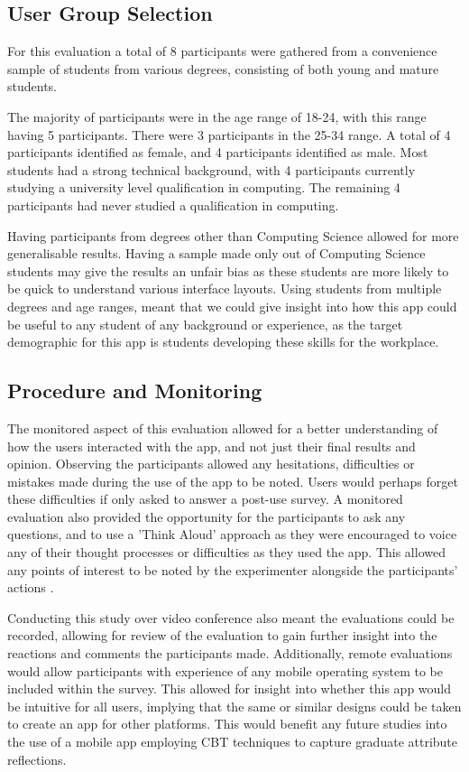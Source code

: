 \documentclass{l4proj}
\begin{document}
\subsection{User Group Selection}

For this evaluation a total of 8 participants were gathered from a convenience sample of students from various degrees, consisting of both young and mature students. 

The majority of participants were in the age range of 18-24, with this range having 5 participants. There were 3 participants in the 25-34 range. A total of 4 participants identified as female, and 4 participants identified as male. Most students had a strong technical background, with 4 participants currently studying a university level qualification in computing. The remaining 4 participants had never studied a qualification in computing.

Having participants from degrees other than Computing Science allowed for more generalisable results. Having a sample made only out of Computing Science students may give the results an unfair bias as these students are more likely to be quick to understand various interface layouts. Using students from multiple degrees and age ranges, meant that we could give insight into how this app could be useful to any student of any background or experience, as the target demographic for this app is students developing these skills for the workplace.

\subsection{Procedure and Monitoring}

The monitored aspect of this evaluation allowed for a better understanding of how the users interacted with the app, and not just their final results and opinion. Observing the participants allowed any hesitations, difficulties or mistakes made during the use of the app to be noted. Users would perhaps forget these difficulties if only asked to answer a post-use survey. A monitored evaluation also provided the opportunity for the participants to ask any questions, and to use a 'Think Aloud' approach as they were encouraged to voice any of their thought processes or difficulties as they used the app. This allowed any points of interest to be noted by the experimenter alongside the participants’ actions \citep{lewis_task-centered_1994}.

Conducting this study over video conference also meant the evaluations could be recorded, allowing for review of the evaluation to gain further insight into the reactions and comments the participants made. Additionally, remote evaluations would allow participants with experience of any mobile operating system to be included within the survey. This allowed for insight into whether this app would be intuitive for all users, implying that the same or similar designs could be taken to create an app for other platforms. This would benefit any future studies into the use of a mobile app employing CBT techniques to capture graduate attribute reflections. 
 
\end{document}
